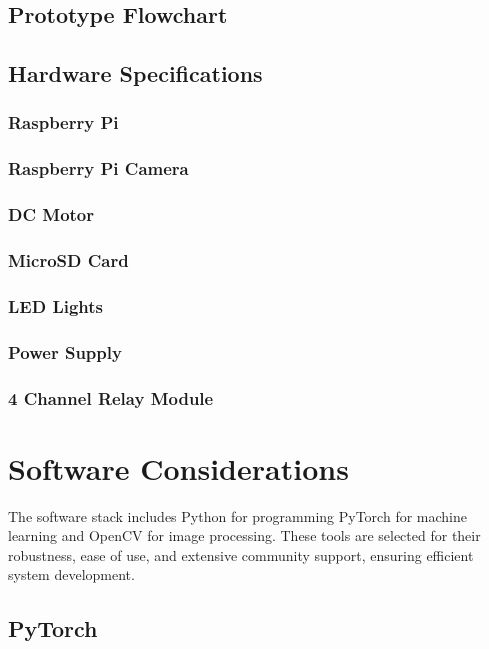 \subsection{Prototype Flowchart}

\subsection{Hardware Specifications}

\subsubsection{Raspberry Pi}

\subsubsection{Raspberry Pi Camera}

\subsubsection{DC Motor}

\subsubsection{MicroSD Card}

\subsubsection{LED Lights}

\subsubsection{Power Supply}

\subsubsection{4 Channel Relay Module}

\section{Software Considerations}
The software stack includes Python for programming PyTorch for machine learning and OpenCV for image processing. These tools are selected for their robustness, ease of use, and extensive community support, ensuring efficient system development.

\subsection{PyTorch}

